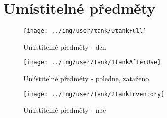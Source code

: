 
\section{Umístitelné předměty}



\begin{figure}[h!]\centering
\texttt{[image: ../img/user/tank/0tankFull]}

\caption{Umístitelné předměty - den}
\label{fig:user_tank_0tankFull}

\end{figure}

\begin{figure}[h!]\centering
\texttt{[image: ../img/user/tank/1tankAfterUse]}

\caption{Umístitelné předměty - poledne, zataženo}
\label{fig:user_tank_1tankAfterUse}

\end{figure}

\begin{figure}[h!]\centering
\texttt{[image: ../img/user/tank/2tankInventory]}

\caption{Umístitelné předměty - noc}
\label{fig:user_tank_2tankInventory}

\end{figure}

